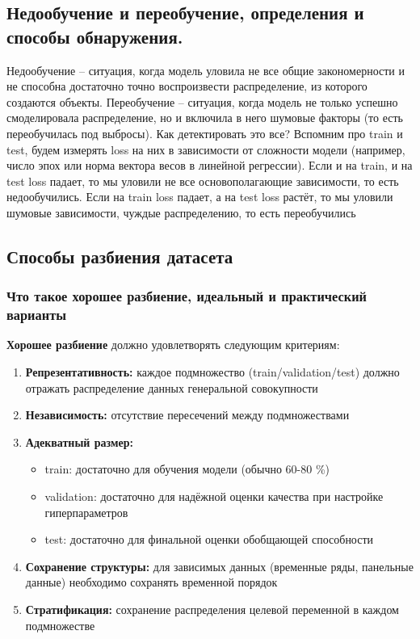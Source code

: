 \subsection{Недообучение и переобучение, определения и способы обнаружения.}

Недообучение -- ситуация, когда модель уловила не все общие закономерности и не способна достаточно точно воспроизвести
распределение, из которого создаются объекты.
Переобучение -- ситуация, когда модель не только успешно смоделировала распределение, но и включила в него шумовые
факторы (то есть переобучилась под выбросы).
Как детектировать это все?
Вспомним про train и test, будем измерять loss на них в зависимости от сложности модели
(например, число эпох или норма вектора весов в линейной регрессии).
Если и на train, и на test loss падает, то мы уловили не все основополагающие зависимости, то есть недообучились.
Если на train loss падает, а на test loss растёт, то мы уловили шумовые зависимости, чуждые распределению, то есть
переобучились

\subsection{Способы разбиения датасета}

\subsubsection{Что такое хорошее разбиение, идеальный и практический варианты}

\textbf{Хорошее разбиение} должно удовлетворять следующим критериям:

\begin{enumerate}
    \item \textbf{Репрезентативность:} каждое подмножество (train/validation/test) должно отражать распределение
    данных генеральной совокупности
    \item \textbf{Независимость:} отсутствие пересечений между подмножествами
    \item \textbf{Адекватный размер:}
    \begin{itemize}
        \item train: достаточно для обучения модели (обычно 60-80 \%)
        \item validation: достаточно для надёжной оценки качества при настройке гиперпараметров
        \item test: достаточно для финальной оценки обобщающей способности
    \end{itemize}
    \item \textbf{Сохранение структуры:} для зависимых данных (временные ряды, панельные данные) необходимо
    сохранять временной порядок
    \item \textbf{Стратификация:} сохранение распределения целевой переменной в каждом подмножестве
\end{enumerate}

